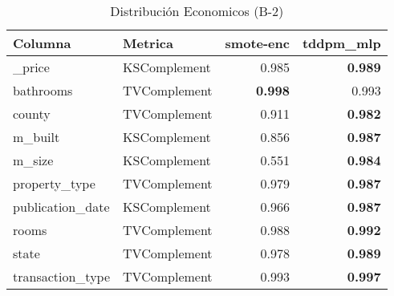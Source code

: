 \begin{table}[H]
\centering
\caption{Distribución Economicos (B-2)}
\label{table-shape-economicos-b-2}
\begin{tabular}{|l|l|r|r|}
\hline
\rowcolor[gray]{0.8}
Columna & Metrica & smote-enc & tddpm\_mlp \\
\hline \_price & KSComplement & 0.985 & \bfseries 0.989 \\
\hline bathrooms & TVComplement & \bfseries 0.998 & 0.993 \\
\hline county & TVComplement & 0.911 & \bfseries 0.982 \\
\hline m\_built & KSComplement & 0.856 & \bfseries 0.987 \\
\hline m\_size & KSComplement & 0.551 & \bfseries 0.984 \\
\hline property\_type & TVComplement & 0.979 & \bfseries 0.987 \\
\hline publication\_date & KSComplement & 0.966 & \bfseries 0.987 \\
\hline rooms & TVComplement & 0.988 & \bfseries 0.992 \\
\hline state & TVComplement & 0.978 & \bfseries 0.989 \\
\hline transaction\_type & TVComplement & 0.993 & \bfseries 0.997 \\
\hline
\end{tabular}
\end{table}
